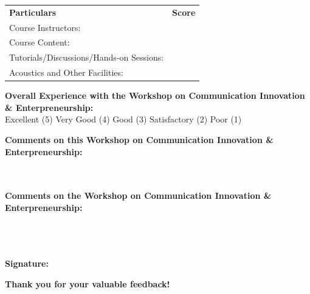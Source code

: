 \documentclass[10pt]{article}
\begin{document}
\vspace{0.3cm}
\begin{tabular}{p{} p{}}
\textbf{Particulars} & \textbf{Score} \\[0.5ex]
Course Instructors: & \underline{\hspace{3cm}} \\
Course Content: & \underline{\hspace{3cm}} \\
Tutorials/Discussions/Hands-on Sessions: & \underline{\hspace{3cm}} \\
Acoustics and Other Facilities: & \underline{\hspace{3cm}} \\
\end{tabular}

\vspace{0.3cm}
\textbf{Overall Experience with the Workshop on Communication Innovation \& Enterpreneurship:}\\[0.1cm]
Excellent (5) \quad Very Good (4) \quad Good (3) \quad Satisfactory (2) \quad Poor (1)

\vspace{0.5cm}
\textbf{Comments on this Workshop on Communication Innovation \& Enterpreneurship:}\\[0.1cm]
\underline{\hspace{\textwidth}}\\[0.5cm]
\underline{\hspace{\textwidth}}\\[0.5cm]
\underline{\hspace{\textwidth}}

\vspace{0.5cm}
\textbf{Comments on the Workshop on Communication Innovation \& Enterpreneurship:}\\[0.1cm]
\underline{\hspace{\textwidth}}\\[0.5cm]
\underline{\hspace{\textwidth}}\\[0.5cm]
\underline{\hspace{\textwidth}}\\[0.5cm]
\underline{\hspace{\textwidth}}

\vspace{0.5cm}
\textbf{Signature:} \underline{\hspace{4cm}}

\vspace{0.5cm}
\begin{center}
    \textbf{Thank you for your valuable feedback!}
\end{center}
\end{document}
